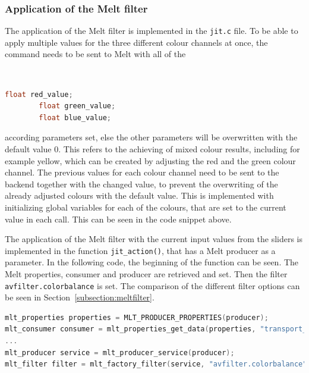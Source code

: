\documentclass[../MasterThesis.tex]{subfiles}
\begin{document}
\subsubsection*{Application of the Melt filter}


\begin{minipage}{0.60\textwidth}
	The application of the Melt filter is implemented in the \texttt{jit.c} file. To be able to apply multiple values for the three different colour channels at once, the command needs to be sent to Melt with all of the 
\end{minipage}\begin{minipage}{0.04\textwidth}
	\ 
\end{minipage}\begin{minipage}{0.36\textwidth}
	{\tiny\begin{lstlisting}[language=c, numbers=none]
		float red_value;
		float green_value;
		float blue_value; \end{lstlisting}}
	\vfill
\end{minipage}
\vspace*{0.1em}

according parameters set, else the other parameters will be overwritten with the default value $0$. This refers to the achieving of mixed colour results, including for example yellow, which can be created by adjusting the red and the green colour channel. The previous values for each colour channel need to be sent to the backend together with the changed value, to prevent the overwriting of the already adjusted colours with the default value. This is implemented with initializing global variables for each of the colours, that are set to the current value in each call. This can be seen in the code snippet above.

The application of the Melt filter with the current input values from the sliders is implemented in the function \texttt{jit\_action()}, that has a Melt producer as a parameter. In the following code, the beginning of the function can be seen. The Melt properties, consumer and producer are retrieved and set. Then the filter \texttt{avfilter.colorbalance} is set. The comparison of the different filter options can be seen in Section~\ref{subsection:meltfilter}.


\begin{lstlisting}[language=c, numbers=none, columns=fullflexible]	
mlt_properties properties = MLT_PRODUCER_PROPERTIES(producer);
mlt_consumer consumer = mlt_properties_get_data(properties, "transport_consumer", NULL);
...	
mlt_producer service = mlt_producer_service(producer);
mlt_filter filter = mlt_factory_filter(service, "avfilter.colorbalance", NULL);	
\end{lstlisting}
\end{document}
